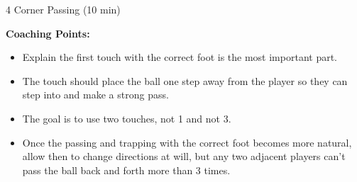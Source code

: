 \begin{evenBlock}{4 Corner Passing (10 min)}
\begin{minipage}[t]{\linewidth}
\begin{minipage}{.6\linewidth}
        \textbf{Coaching Points:}
        \begin{itemize}
            \setlength{\itemsep}{0pt}
            \setlength{\parskip}{0pt}
            \setlength{\parsep}{0pt}
            \item Explain the first touch with the correct foot is the most important part.
            \item The touch should place the ball one step away from the player so they can step into and make a strong pass.
            \item The goal is to use two touches, not 1 and not 3.
            \item Once the passing and trapping with the correct foot becomes more natural, allow then to change directions at will, but any two adjacent players can't pass the ball back and forth more than 3 times.
        \end{itemize}

    \end{minipage}
\end{minipage}

\end{evenBlock}